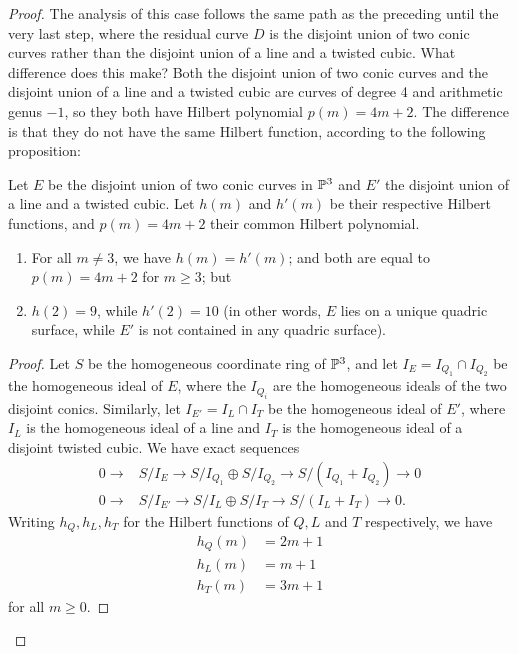 \begin{proof}

The analysis of this case follows the same path as the preceding until the very last step, where the residual curve $D$ is the disjoint union of two conic curves rather than the disjoint union of a line and a twisted cubic. What difference does this make? Both the disjoint union of two conic curves and the disjoint union of a line and a twisted cubic are curves of degree 4 and arithmetic genus $-1$, so they both have Hilbert polynomial $p(m) = 4m+2$. The difference is that they do not have the same Hilbert function, according to the following proposition:

\begin{proposition}\label{quartic curve postulation}
Let $E$ be the  disjoint union of two conic curves in ${\mathbb P}^3$ and $E'$ the disjoint union of a line and a twisted cubic. Let $h(m)$ and $h'(m)$ be their respective Hilbert functions, and $p(m) = 4m+2$ their common Hilbert polynomial.
\begin{enumerate}
\item For all $m \neq 3$, we have $h(m) = h'(m)$; and both are equal to $p(m) = 4m+2$ for $m\geq 3$; but
\item $h(2) = 9$, while $h'(2) = 10$ (in other words, $E$ lies on a unique quadric surface, while $E'$ is not contained in any quadric surface).
\end{enumerate}
\end{proposition}

\begin{proof} 
Let $S$ be the homogeneous coordinate ring of ${\mathbb P}^3$, and let
$I_E = I_{Q_1}\cap I_{Q_2}$ be the homogeneous ideal of $E$, where the $I_{Q_i}$ are the homogeneous
ideals of the two disjoint conics. Similarly, let $I_{E'} = I_L\cap I_T$ be the
homogeneous ideal of $E'$, where $I_L$ is the homogeneous ideal of a line and $I_T$ is the homogeneous ideal
of a disjoint twisted cubic. We have exact sequences
\begin{align*}
0\to &S/I_E \to S/I_{Q_1} \oplus S/I_{Q_2} \to S/(I_{Q_1}+I_{Q_2})\to 0\\
0\to &S/I_{E'} \to S/I_L \oplus S/I_T \to S/(I_L+I_T)\to 0.
\end{align*}
Writing $h_Q, h_L,h_T$ for the Hilbert functions of $Q,L$ and $T$ respectively, we have
\begin{align*}
h_Q(m) &= 2m+1\\
h_L(m) &= m+1\\
h_T(m) &=3m+1 
\end{align*}
for all $m\geq 0$. 


\end{proof}
\end{proof}
